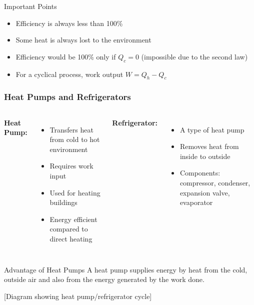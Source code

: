 \documentclass{beamer}
\begin{document}
\begin{frame}
    \begin{block}{Important Points}
        \begin{itemize}
            \item Efficiency is always less than 100\%
            \item Some heat is always lost to the environment
            \item Efficiency would be 100\% only if $Q_c = 0$ (impossible due to the second law)
            \item For a cyclical process, work output $W = Q_h - Q_c$
        \end{itemize}
    \end{block}
\end{frame}

\begin{frame}
    \frametitle{Heat Pumps and Refrigerators}
    \begin{columns}
        \textbf{Heat Pump:}
        \begin{itemize}
            \item Transfers heat from cold to hot environment
            \item Requires work input
            \item Used for heating buildings
            \item Energy efficient compared to direct heating
        \end{itemize}
        
        \textbf{Refrigerator:}
        \begin{itemize}
            \item A type of heat pump
            \item Removes heat from inside to outside
            \item Components: compressor, condenser, expansion valve, evaporator
        \end{itemize}
    \end{columns}
    
    \begin{block}{Advantage of Heat Pumps}
        A heat pump supplies energy by heat from the cold, outside air and also from the energy generated by the work done.
    \end{block}
    
    \begin{center}
        \alert{[Diagram showing heat pump/refrigerator cycle]}
    \end{center}
\end{frame}
\end{document}
